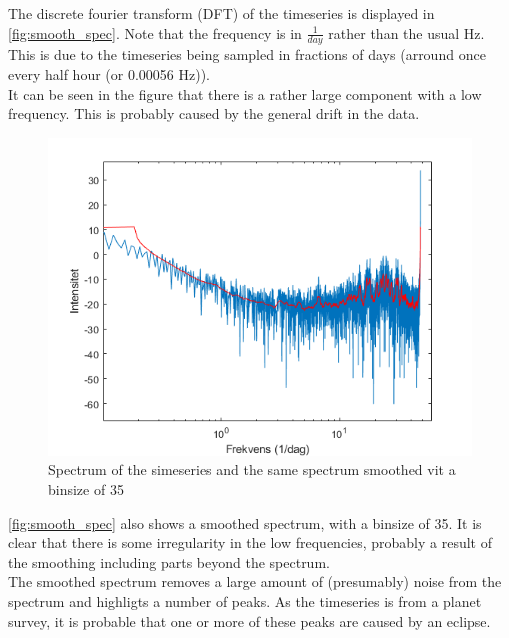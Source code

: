 The discrete fourier transform (DFT) of the timeseries is displayed in \autoref{fig:smooth_spec}. Note that the frequency is in $\frac{1}{day}$ rather than the usual Hz. This is due to the timeseries being sampled in fractions of days (arround once every half hour (or 0.00056 Hz)).\\
It can be seen in the figure that there is a rather large component with a low frequency. This is probably caused by the general drift in the data.\\ 

\begin{figure}[h]
    \centering
    \includegraphics[width = \textwidth]{smooth_spectrum.png}
    \caption{Spectrum of the simeseries and the same spectrum smoothed vit a binsize of 35}
    \label{fig:smooth_spec}
\end{figure}

\autoref{fig:smooth_spec} also shows a smoothed spectrum, with a binsize of 35. It is clear that there is some irregularity in the low frequencies, probably a result of the smoothing including parts beyond the spectrum.\\

The smoothed spectrum removes a large amount of (presumably) noise from the spectrum and highligts a number of peaks. As the timeseries is from a planet survey, it is probable that one or more of these peaks are caused by an eclipse.
